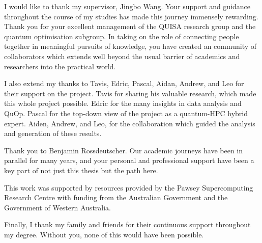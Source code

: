 I would like to thank my supervisor, Jingbo Wang. Your support and guidance throughout the course of my studies has made this journey immensely rewarding. Thank you for your excellent management of the QUISA research group and the quantum optimisation subgroup. In taking on the role of connecting people together in meaningful pursuits of knowledge, you have created an community of collaborators which extends well beyond the usual barrier of academics and researchers into the practical world.

I also extend my thanks to Tavis, Edric, Pascal, Aidan, Andrew, and Leo for their support on the project. Tavis for sharing his valuable research, which made this whole project possible. Edric for the many insights in data analysis and QuOp. Pascal for the top-down view of the project as a quantum-HPC hybrid expert. Aiden, Andrew, and Leo, for the collaboration which guided the analysis and generation of these results.

Thank you to Benjamin Rossdeutscher. Our academic journeys have been in parallel for many years, and your personal and professional support have been a key part of not just this thesis but the path here.

This work was supported by resources provided by the Pawsey Supercomputing Research Centre with funding from the Australian Government and the Government of Western Australia.

Finally, I thank my family and friends for their continuous support throughout my degree. Without you, none of this would have been possible.